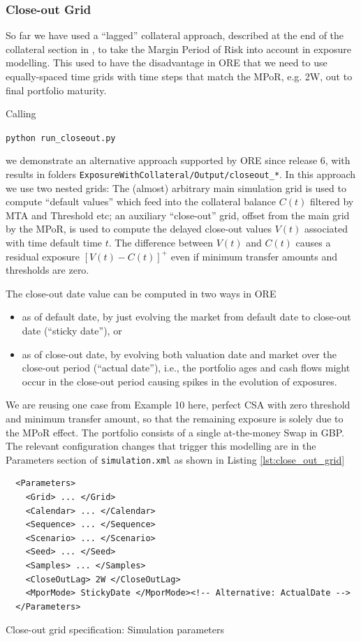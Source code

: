 \subsubsection{Close-out Grid}

So far  we have used a ``lagged'' collateral approach, described at the end of the collateral section in \cite{methods},
to take the Margin Period of Risk into account in exposure modelling. This used to have the disadvantage in ORE that we need
to use equally-spaced time grids with time steps that match the MPoR, e.g. 2W, out to final portfolio maturity. 

Calling

\medskip
\centerline{\tt python run\_closeout.py } 
\medskip

we demonstrate an alternative approach supported by ORE since release 6, with results in folders
{\tt ExposureWithCollateral/Output/closeout\_*}. In this approach we use two nested grids:
The (almost) arbitrary main simulation grid is used to compute ``default values'' which feed into the collateral
balance $C(t)$ filtered by MTA and Threshold etc; an auxiliary ``close-out'' grid, offset from the main grid by the MPoR,
is used to compute the delayed close-out values $V(t)$ associated with time default time $t$. The difference between $V(t)$
and $C(t)$ causes a residual exposure $[V(t)-C(t)]^+$ even if minimum transfer amounts and thresholds are zero.

The close-out date value can be computed in two ways in ORE
\begin{itemize}
\item as of default date, by just evolving the market from default date to close-out date
   (``sticky date''), or 
\item  as of close-out date, by evolving both valuation date and market over the 
   close-out period (``actual date''), i.e., the portfolio ages and cash flows might occur
   in the close-out period causing spikes in the evolution of exposures. 
\end{itemize}

We are reusing one case from Example 10 here, perfect CSA with zero threshold and
minimum transfer amount, so that the remaining exposure is solely due to the MPoR
effect. The portfolio consists of a single at-the-money Swap in GBP. 
The relevant configuration changes that trigger this modelling are in the Parameters section of {\tt simulation.xml} as shown in Listing \ref{lst:close_out_grid}

\begin{listing}[H]
\begin{verbatim}
  <Parameters>
    <Grid> ... </Grid>
    <Calendar> ... </Calendar>
    <Sequence> ... </Sequence>
    <Scenario> ... </Scenario>
    <Seed> ... </Seed>
    <Samples> ... </Samples>
    <CloseOutLag> 2W </CloseOutLag>
    <MporMode> StickyDate </MporMode><!-- Alternative: ActualDate -->
  </Parameters>
\end{verbatim}
\caption{Close-out grid specification: Simulation parameters}
\label{lst:close_out_grid}
\end{listing}

